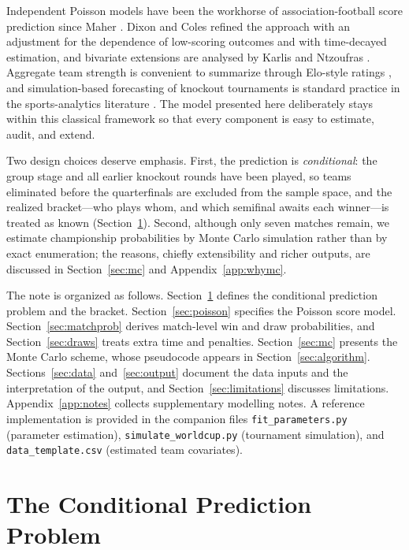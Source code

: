\documentclass[11pt]{article}
\begin{document}
Independent Poisson models have been the workhorse of association-football
score prediction since Maher \cite{maher1982modelling}. Dixon and Coles
\cite{dixon1997modelling} refined the approach with an adjustment for the
dependence of low-scoring outcomes and with time-decayed estimation, and
bivariate extensions are analysed by Karlis and Ntzoufras
\cite{karlis2003analysis}. Aggregate team strength is convenient
to summarize through Elo-style ratings \cite{elo1978rating}, and
simulation-based forecasting of knockout tournaments is standard practice in
the sports-analytics literature \cite{koning2003simulation,groll2019hybrid}.
The model
presented here deliberately stays within this classical framework so that
every component is easy to estimate, audit, and extend.

Two design choices deserve emphasis. First, the prediction is
\emph{conditional}: the group stage and all earlier knockout rounds have been
played, so teams eliminated before the quarterfinals are excluded from the
sample space, and the realized bracket---who plays whom, and which semifinal
awaits each winner---is treated as known
(Section~\ref{sec:conditional}). Second, although only seven matches remain,
we estimate championship probabilities by Monte Carlo simulation rather than
by exact enumeration; the reasons, chiefly extensibility and richer outputs,
are discussed in Section~\ref{sec:mc} and Appendix~\ref{app:whymc}.

The note is organized as follows. Section~\ref{sec:conditional} defines the
conditional prediction problem and the bracket.
Section~\ref{sec:poisson} specifies the Poisson score model.
Section~\ref{sec:matchprob} derives match-level win and draw probabilities,
and Section~\ref{sec:draws} treats extra time and penalties.
Section~\ref{sec:mc} presents the Monte Carlo scheme, whose pseudocode appears
in Section~\ref{sec:algorithm}. Sections~\ref{sec:data}
and~\ref{sec:output} document the data inputs and the interpretation of the
output, and Section~\ref{sec:limitations} discusses limitations.
Appendix~\ref{app:notes} collects supplementary modelling notes. A reference
implementation is provided in the companion files \texttt{fit\_parameters.py}
(parameter estimation), \texttt{simulate\_worldcup.py} (tournament
simulation), and \texttt{data\_template.csv} (estimated team covariates).

\section{The Conditional Prediction Problem}
\label{sec:conditional}
\end{document}
